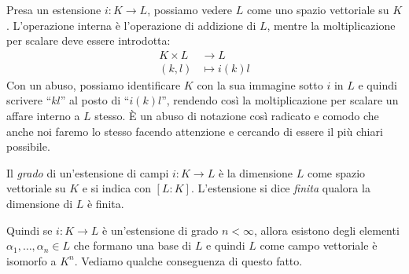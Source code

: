 Presa un estensione $i : K \to L$, possiamo vedere $L$ come uno spazio vettoriale su $K$. L'operazione interna è l'operazione di addizione di $L$, mentre la moltiplicazione per scalare deve essere introdotta:
\begin{align*}
K \times L &\to L \\
(k, l) &\mapsto i(k)l
\end{align*}
Con un abuso, possiamo identificare $K$ con la sua immagine sotto $i$ in $L$ e quindi scrivere \enquote{$kl$} al posto di \enquote{$i(k)l$}, rendendo così la moltiplicazione per scalare un affare interno a $L$ stesso. È un abuso di notazione così radicato e comodo che anche noi faremo lo stesso facendo attenzione e cercando di essere il più chiari possibile.


\begin{defi}
Il {\em grado} di un'estensione di campi $i : K \to L$ è la dimensione $L$ come spazio vettoriale su $K$ e si indica con $[L:K]$. L'estensione si dice {\em finita} qualora la dimensione di $L$ è finita.
\end{defi}


Quindi se $i : K \to L$ è un'estensione di grado $n < \infty$, allora esistono degli elementi $\alpha_1, \dots{}, \alpha_n \in L$ che formano una base di $L$ e quindi $L$ come campo vettoriale è isomorfo a $K^n$. Vediamo qualche conseguenza di questo fatto.

